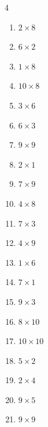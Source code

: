 \begin{multicols}{4}
\begin{enumerate}
  \item $2\times 8$
        \phantom{$=16$}

  \item $6\times 2$
        \phantom{$=12$}

  \item $1\times 8$
        \phantom{$=8$}

  \item $10\times 8$
        \phantom{$=80$}

  \item $3\times 6$
        \phantom{$=18$}

  \item $6\times 3$
        \phantom{$=18$}

  \item $9\times 9$
        \phantom{$=81$}

  \item $2\times 1$
        \phantom{$=2$}

  \item $7\times 9$
        \phantom{$=63$}

  \item $4\times 8$
        \phantom{$=32$}

  \item $7\times 3$
        \phantom{$=21$}

  \item $4\times 9$
        \phantom{$=36$}

\columnbreak %

  \item $1\times 6$
        \phantom{$=6$}

  \item $7\times 1$
        \phantom{$=7$}

  \item $9\times 3$
        \phantom{$=27$}

  \item $8\times 10$
        \phantom{$=80$}

  \item $10\times 10$
        \phantom{$=100$}

  \item $5\times 2$
        \phantom{$=10$}

  \item $2\times 4$
        \phantom{$=8$}

  \item $9\times 5$
        \phantom{$=45$}

  \item $9\times 9$
        \phantom{$=81$}


\end{enumerate}
\end{multicols}
